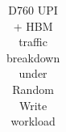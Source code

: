 \begin{table}[t]
\begin{tabular}{|l|cc|cc|cc||cc|cc|cc|}
\end{tabular}

\caption{D760 UPI + HBM traffic breakdown under Random Write workload}
\label{tab:upi-hbm-traffic}
\end{table}
